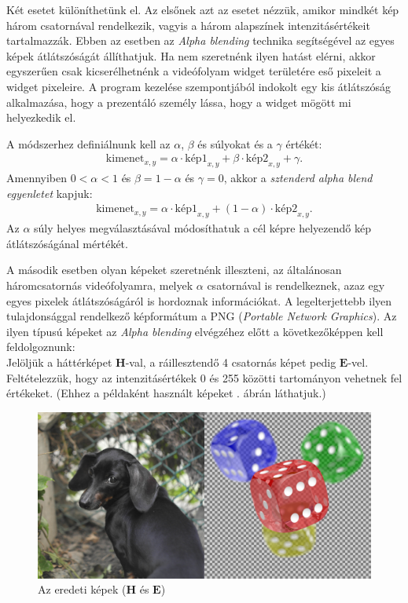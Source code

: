 Két esetet különíthetünk el. Az elsőnek azt az esetet nézzük, amikor mindkét kép három csatornával rendelkezik, vagyis a három alapszínek intenzitásértékeit tartalmazzák. Ebben az esetben az \textit{Alpha blending} technika segítségével az egyes képek átlátszóságát állíthatjuk. Ha nem szeretnénk ilyen hatást elérni, akkor egyszerűen csak kicserélhetnénk a videófolyam widget területére eső pixeleit a widget pixeleire. A program kezelése szempontjából indokolt egy kis átlátszóság alkalmazása, hogy a prezentáló személy lássa, hogy a widget mögött mi helyezkedik el.

A módszerhez definiálnunk kell az $\alpha$, $\beta$ és súlyokat és a $\gamma$ értékét:
\begin{align*}
	\text{kimenet}_{x,y} = \alpha \cdot \text{kép1}_{x,y} + \beta \cdot \text{kép2}_{x,y} + \gamma.
\end{align*}
Amennyiben $0<\alpha<1$ és $\beta = 1 - \alpha$ és $\gamma = 0$, akkor a \textit{sztenderd alpha blend egyenletet}\cite{bradski2008learning} kapjuk:
\begin{align*}
		\text{kimenet}_{x,y} = \alpha \cdot \text{kép1}_{x,y} + (1-\alpha) \cdot \text{kép2}_{x,y}.
\end{align*}
Az $\alpha$ súly helyes megválasztásával módosíthatuk a cél képre helyezendő kép átlátszóságánal mértékét.

A második esetben olyan képeket szeretnénk illeszteni, az általánosan háromcsatornás videófolyamra, melyek $\alpha$ csatornával is rendelkeznek, azaz egy egyes pixelek átlátszóságáról is hordoznak információkat. A legelterjettebb ilyen tulajdonsággal rendelkező képformátum a PNG (\textit{Portable Network Graphics}). Az ilyen típusú képeket az \textit{Alpha blending} elvégzéhez előtt a következőképpen kell feldolgoznunk:\\
Jelöljük a háttérképet $\boldsymbol H$-val, a ráillesztendő 4 csatornás képet pedig $\boldsymbol E$-vel. Feltételezzük, hogy az intenzitásértékek 0 és 255 közötti tartományon vehetnek fel értékeket. (Ehhez a példaként használt képeket . ábrán láthatjuk.)

\begin{figure}[h]
	\centering
	\includegraphics[scale=1.3]{images/blending_01.png}
	\caption{Az eredeti képek ($\boldsymbol H$ és  $\boldsymbol E$)}
	\label{fig:blend01}
\end{figure}	

